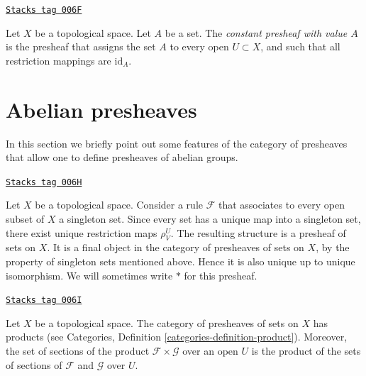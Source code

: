 \begin{definition}
\label{sheaves-definition-constant-presheaf}
\href{https://stacks.math.columbia.edu/tag/006F}{\texttt{Stacks tag 006F}}

Let $X$ be a topological space. Let $A$ be a set.
The {\it constant presheaf with value $A$} is the
presheaf that assigns the set $A$ to every open
$U \subset X$, and such that all restriction mappings
are $\text{id}_A$.
\end{definition}

\section{Abelian presheaves}
\label{sheaves-section-abelian-presheaves}
In this section we briefly point out some features of the
category of presheaves that allow one to define presheaves
of abelian groups.

\begin{example}
\label{sheaves-example-singleton-presheaf}
\href{https://stacks.math.columbia.edu/tag/006H}{\texttt{Stacks tag 006H}}

Let $X$ be a topological space. Consider a rule $\mathcal{F}$ that
associates to every open subset of $X$ a singleton set. Since every set
has a unique map into a singleton set, there exist unique restriction
maps $\rho^U_V$. The resulting structure is a presheaf of sets on $X$.
It is a final object in the category of presheaves of sets on $X$, by the
property of singleton sets mentioned above. Hence it is
also unique up to unique isomorphism. We will sometimes write $*$
for this presheaf.
\end{example}

\begin{lemma}
\label{sheaves-lemma-product-presheaves}
\href{https://stacks.math.columbia.edu/tag/006I}{\texttt{Stacks tag 006I}}

Let $X$ be a topological space. The category of presheaves of sets
on $X$ has products (see
Categories, Definition \ref{categories-definition-product}).
Moreover, the set of
sections of the product $\mathcal{F} \times \mathcal{G}$
over an open $U$ is the product of the sets of sections of
$\mathcal{F}$ and $\mathcal{G}$ over $U$.
\end{lemma}

